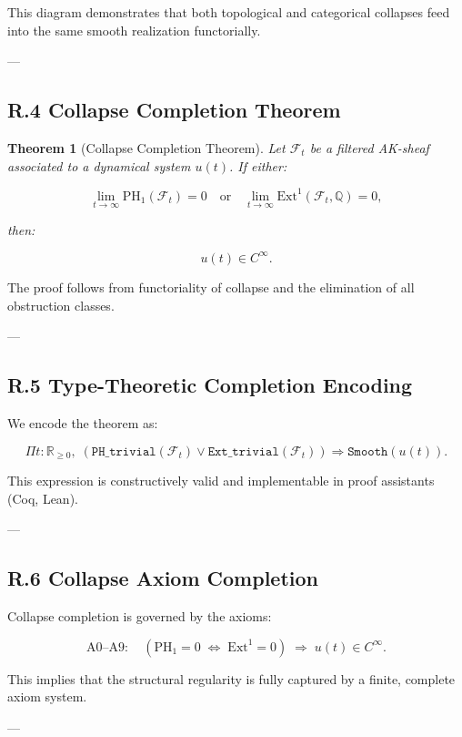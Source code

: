 \documentclass[11pt]{article}
\newtheorem{theorem}{Theorem}[section]
\begin{document}
\noindent
This diagram demonstrates that both topological and categorical collapses feed into the same smooth realization functorially.

---

\subsection*{R.4 Collapse Completion Theorem}

\begin{theorem}[Collapse Completion Theorem]
\label{thm:collapse-completion}
Let $\mathcal{F}_t$ be a filtered AK-sheaf associated to a dynamical system $u(t)$.  
If either:

\[
\lim_{t \to \infty} \mathrm{PH}_1(\mathcal{F}_t) = 0 \quad \text{or} \quad
\lim_{t \to \infty} \mathrm{Ext}^1(\mathcal{F}_t, \mathbb{Q}) = 0,
\]

then:

\[
u(t) \in C^\infty.
\]
\end{theorem}

The proof follows from functoriality of collapse and the elimination of all obstruction classes.

---

\subsection*{R.5 Type-Theoretic Completion Encoding}

We encode the theorem as:

\[
\Pi t : \mathbb{R}_{\ge 0},\;
\left(
\texttt{PH\_trivial}(\mathcal{F}_t)
\vee
\texttt{Ext\_trivial}(\mathcal{F}_t)
\right)
\Rightarrow
\texttt{Smooth}(u(t)).
\]

This expression is constructively valid and implementable in proof assistants (Coq, Lean).

---

\subsection*{R.6 Collapse Axiom Completion}

Collapse completion is governed by the axioms:

\[
\text{A0–A9}: \quad
(\mathrm{PH}_1 = 0 \;\Leftrightarrow\; \mathrm{Ext}^1 = 0) \;\Rightarrow\; u(t) \in C^\infty.
\]

This implies that the structural regularity is fully captured by a finite, complete axiom system.

---
\end{document}
